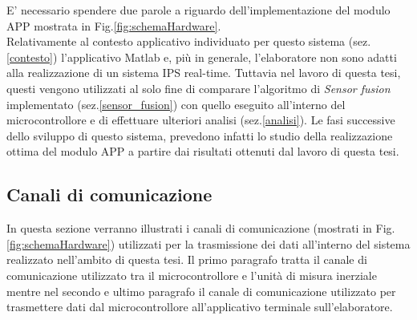 E' necessario spendere due parole a riguardo dell'implementazione del modulo APP mostrata in Fig.\ref{fig:schemaHardware}. \\
Relativamente al contesto applicativo individuato per questo sistema (sez.\ref{contesto}) l'applicativo Matlab e, più in generale, l'elaboratore non sono adatti alla realizzazione di un sistema IPS real-time. Tuttavia nel lavoro di questa tesi, questi vengono utilizzati al solo fine di comparare l'algoritmo di \textit{Sensor fusion} implementato (sez.\ref{sensor_fusion}) con quello eseguito all'interno del microcontrollore e di effettuare ulteriori analisi (sez.\ref{analisi}). Le fasi successive dello sviluppo di questo sistema, prevedono infatti lo studio della realizzazione ottima del modulo APP a partire dai risultati ottenuti dal lavoro di questa tesi.


\subsection{Canali di comunicazione}
In questa sezione verranno illustrati i canali di comunicazione (mostrati in Fig.\ref{fig:schemaHardware}) utilizzati per la trasmissione dei dati all'interno del sistema realizzato nell'ambito di questa tesi. Il primo paragrafo tratta il canale di comunicazione utilizzato tra il microcontrollore e l'unità di misura inerziale mentre nel secondo e ultimo paragrafo il canale di comunicazione utilizzato per trasmettere dati dal microcontrollore all'applicativo terminale sull'elaboratore.
